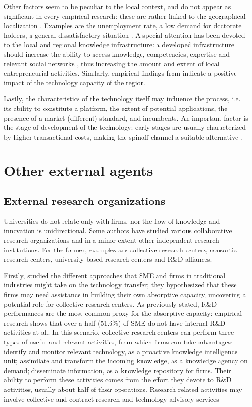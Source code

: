 Other factors seem to be peculiar to the local context, and do not appear as significant in every empirical research: these are rather linked to the geographical localization \citep{OShea2004}. Examples are the unemployment rate, a low demand for doctorate holders, a general dissatisfactory situation \citep{Rizzo2015}. A special attention has been devoted to the local and regional knowledge infrastructure: a developed infrastructure should increase the ability to access knowledge, competencies, expertise and relevant social networks \citep{OShea2004}, thus increasing the amount and extent of local entrepreneurial activities. Similarly, empirical findings from \citet{Audretsch2005} indicate a positive impact of the technology capacity of the region.

Lastly, the characteristics of the technology itself may influence the process, i.e. its ability to constitute a platform, the extent of potential applications, the presence of a market (different) standard, and incumbents. An important factor is the stage of development of the technology: early stages are usually characterized by higher transactional costs, making the spinoff channel a suitable alternative \citep{Rizzo2015}. 

\section{Other external agents}

\subsection{External research organizations}

Universities do not relate only with firms, nor the flow of knowledge and innovation is unidirectional. Some authors have studied various collaborative research organizations and in a minor extent other independent research institutions. For the former, examples are collective research centers, consortia research centers, university-based research centers and R\&D alliances. 

Firstly, \citet{Spithoven2011} studied the different approaches that SME and firms in traditional industries might take on the technology transfer; they hypothesized that these firms may need assistance in building their own absorptive capacity, uncovering a potential role for collective research centers. As previously stated, R\&D performances are the most common proxy for the absorptive capacity: empirical research shows that over a half (51.6\%) of SME do not have internal R\&D activities at all. In this scenario, collective research centers can perform three types of useful and relevant activities, from which firms can take advantages: identify and monitor relevant technology, as a proactive knowledge intelligence unit; assimilate and transform the incoming knowledge, as a knowledge agency on demand; disseminate information, as a knowledge repository for firms. Their ability to perform these activities comes from the effort they devote to R\&D activities, usually about half of their operations. Research related activities may involve collective and contract research and technology advisory services.

